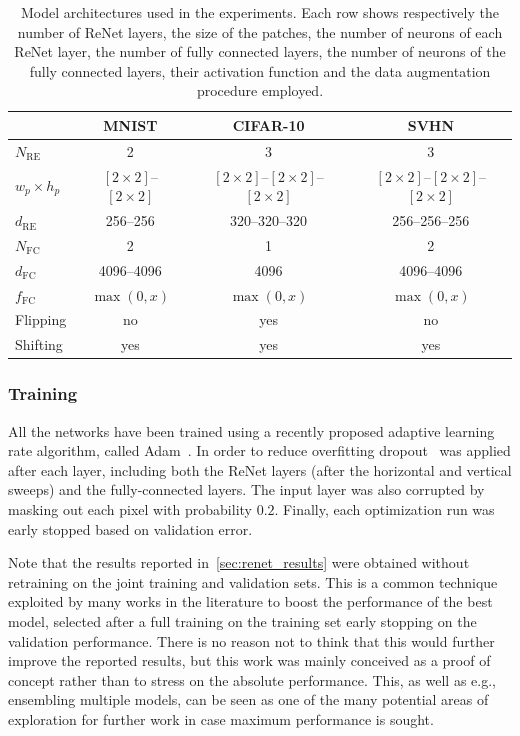 \begin{table}[t]
    \centering
    \begin{tabular}{l || c | c | c }
        & MNIST & CIFAR-10 & SVHN \\
        \hline
        \hline
    $N_{\text{RE}}$ & 2 & 3 & 3 \\
        \hline
        $w_p \times h_p$ & $[2\times 2]$--$[2 \times 2]$ & $[2\times 2]$--$[2 \times 2]$--$[2
        \times 2]$ & $[2\times 2]$--$[2 \times 2]$--$[2 \times 2]$ \\
        \hline
    $d_{\text{RE}}$ & 256--256 & 320--320--320 & 256--256--256 \\
        \hline
    $N_{\text{FC}}$ & 2 & 1 & 2 \\
        \hline
    $d_{\text{FC}}$ & 4096--4096 & 4096 & 4096--4096 \\
        \hline
    $f_{\text{FC}}$ & $\max(0, x)$ & $\max(0,x)$ & $\max(0,x)$ \\
        \hline
    Flipping & no & yes & no \\
        \hline
    Shifting & yes & yes & yes \\
    \end{tabular}
    \caption{Model architectures used in the experiments. Each row shows
             respectively the number of ReNet layers, the size of the patches,
             the number of neurons of each ReNet layer, the number of fully
             connected layers, the number of neurons of the fully connected
             layers, their activation function and the data augmentation
             procedure employed.}
    \label{tbl:renet_architectures}
\end{table}

\subsubsection{Training}
All the networks have been trained using a recently proposed adaptive learning
rate algorithm, called Adam~\citep{Kingma2014}. In order to reduce overfitting
dropout~\citep{Srivastava14} was applied after each layer, including both the
ReNet layers (after the horizontal and vertical sweeps) and the fully-connected
layers. The input layer was also corrupted by masking out each pixel with
probability $0.2$. Finally, each optimization run was early stopped based
on validation error.

Note that the results reported in~\autoref{sec:renet_results} were obtained
without retraining on the joint training and validation sets. This is a common
technique exploited by many works in the literature to boost the performance
of the best model, selected after a full training on the training set early
stopping on the validation performance. There is no reason not to think that
this would further improve the reported results, but this work was mainly
conceived as a proof of concept rather than to stress on the absolute
performance. This, as well as e.g., ensembling multiple models, can be seen as
one of the many potential areas of exploration for further work in case maximum
performance is sought.


